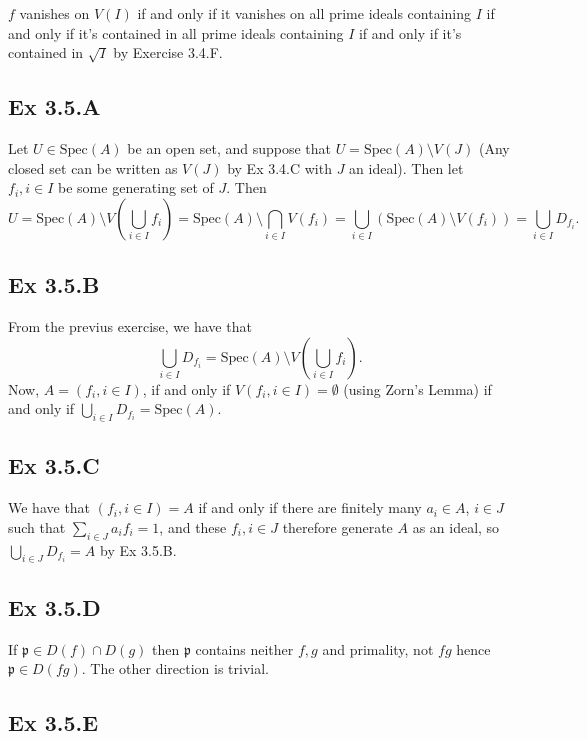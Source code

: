 \documentclass{article}
\theoremstyle{definition}
\newcommand{\Spec}{\text{Spec}}
\begin{document}
$f$ vanishes on $V(I)$ if and only if it vanishes on all prime ideals
containing $I$ if and only if it's contained in all prime ideals containing $I$
if and only if it's contained in $\sqrt{I}$ by Exercise 3.4.F.

\subsection*{Ex 3.5.A}

Let $U \in \Spec(A)$ be an open set, and suppose that $U = \Spec(A) \setminus
V(J)$ (Any closed set can be written as $V(J)$ by Ex 3.4.C with $J$ an ideal).
Then let $f_i, i \in I$ be some generating set of $J$. Then
\[
	U 
	=
	\Spec(A) \setminus V\left( \bigcup_{i \in I} f_i \right)
	=
	\Spec(A) \setminus \bigcap_{i \in I} V\left(f_i\right)
	=
    \bigcup_{i \in I} \left(\Spec(A) \setminus V\left(f_i\right)\right)
	=
	\bigcup_{i \in I} D_{f_i}.
\]

\subsection*{Ex 3.5.B}

From the previus exercise, we have that 
\[
	\bigcup_{i \in I} D_{f_i}
	=
	\Spec(A) \setminus V\left(\bigcup_{i \in I} f_i\right).
\] 
Now, $A = (f_i, i \in I)$, if and only if $V(f_i, i \in I) = \emptyset$ (using
Zorn's Lemma) if and only if $\bigcup_{i \in I} D_{f_i} = \Spec(A)$.

\subsection*{Ex 3.5.C}

We have that $(f_i, i \in I) = A$ if and only if there are finitely many $a_i
\in A$, $i \in J$ such that $\sum_{i \in J} a_i f_i = 1$, and these $f_i, i \in
J$ therefore generate $A$ as an ideal, so $\bigcup_{i \in J} D_{f_i} = A$ by Ex
3.5.B.

\subsection*{Ex 3.5.D}

If $\mathfrak{p} \in D(f) \cap D(g)$ then $\mathfrak{p}$ contains neither $f,
g$ and primality, not $fg$ hence $\mathfrak{p} \in D(fg)$. The other direction
is trivial.

\subsection*{Ex 3.5.E}
\end{document}
